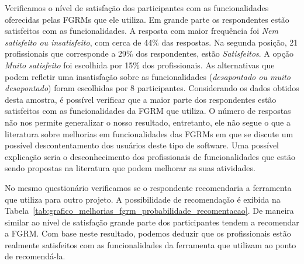 Verificamos o nível de satisfação dos participantes com as funcionalidades
oferecidas pelas FGRMs que ele utiliza. Em grande parte os respondentes estão
satisfeitos com as funcionalidades. A resposta com maior frequência foi
\textit{Nem satisfeito ou insatisfeito}, com cerca de 44\% das respostas. Na
segunda posição, 21 profissionais que corresponde a 29\% dos respondentes, estão
\textit{Satisfeitos}. A opção \textit{Muito satisfeito} foi escolhida por 15\%
dos profissionais. As alternativas que podem refletir uma insatisfação sobre as
funcionalidades (\textit{desapontado ou muito desapontado}) foram escolhidas por
8 participantes. Considerando os dados obtidos desta amostra, é possível
verificar que a maior parte dos respondentes estão satisfeitos com as
funcionalidades da FGRM que utiliza. O número de respostas não nos permite
generalizar o nosso resultado, entretanto, ele não segue o que a literatura
sobre melhorias em funcionalidades das FGRMs em que se discute um possível
descontentamento dos usuários deste tipo de software. Uma possível explicação
seria o desconhecimento dos profissionais de funcionalidades que estão sendo
propostas na literatura que podem melhorar as suas atividades.


No mesmo questionário verificamos se o respondente recomendaria a ferramenta que
utiliza para outro projeto. A possibilidade de recomendação é exibida na
Tabela~\ref{tab:grafico_melhorias_fgrm_probabilidade_recomentacao}. De maneira
similar ao nível de satisfação grande parte dos participantes tendem a
recomendar a FGRM\@. Com base neste resultado, podemos deduzir que os
profissionais estão realmente satisfeitos com as funcionalidades da ferramenta
que utilizam ao ponto de recomendá-la.


